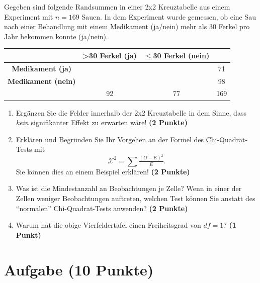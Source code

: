 \documentclass[a4paper, 9pt]{scrartcl}\usepackage[]{graphicx}\usepackage[]{xcolor}
\begin{document}
Gegeben sind folgende Randsummen in einer 2x2 Kreuztabelle aus einem
Experiment mit $n = 169$ Sauen. In dem Experiment wurde gemessen,
ob eine Sau nach einer Behandlung mit einem Medikament (ja/nein)
mehr als 30 Ferkel pro Jahr bekommen konnte (ja/nein).

\vspace{5Ex}

\begin{center}
  \Large
  \begin{tabular}{c|c|c|c}
     & \textbf{>30 Ferkel (ja)} & \textbf{$\leq$30 Ferkel (nein)} &  \strut\\
    \hline
    \textbf{Medikament (ja)} & \phantom{100}  & \phantom{100}  &   71  \strut\\
    \hline
    \textbf{Medikament (nein)} & \phantom{100}  & \phantom{100}  &   98   \strut\\
    \hline
     &  92 &  77 &  169  \strut\\
  \end{tabular}
\end{center}



\vspace{5Ex}

\begin{enumerate}
\item Erg{\"a}nzen Sie die Felder innerhalb der 2x2 Kreuztabelle in dem Sinne,
  dass \textit{kein} signifikanter Effekt zu erwarten w{\"a}re!
  \textbf{(2 Punkte)}
\item Erkl{\"a}ren und Begr{\"u}nden Sie Ihr Vorgehen an der Formel des
  Chi-Quadrat-Tests mit
  \begin{equation*}
  \mathcal{X}^2 = \sum\tfrac{(O - E)^2}{E}.  
  \end{equation*}
  Sie k{\"o}nnen dies an einem Beispiel erkl{\"a}ren! \textbf{(2 Punkte)}
\item Was ist die Mindestanzahl an Beobachtungen je Zelle? Wenn in einer
  der Zellen weniger Beobachtungen auftreten, welchen Test k{\"o}nnen Sie
  anstatt des "`normalen"' Chi-Quadrat-Tests anwenden? \textbf{(2 Punkte)}
\item Warum hat die obige Vierfeldertafel einen Freiheitsgrad von $df=1$?
  \textbf{(1 Punkt)}
\end{enumerate} 
\clearpage

\section{Aufgabe \hfill (10 Punkte)}
\end{document}
